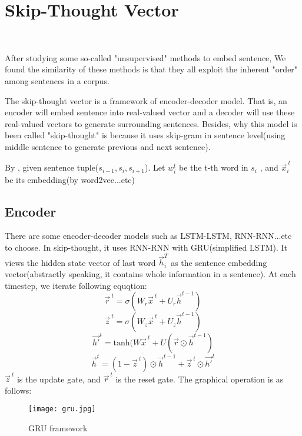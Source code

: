 \documentclass{article}
\begin{document}
\section{Skip-Thought Vector}
~~~~\par After studying some so-called "unsupervised" methods to embed sentence, We found the similarity of these methods is that they all exploit the inherent "order" among sentences in a corpus. 
	\newline

	\par The skip-thought vector is a framework of encoder-decoder model. That is, an encoder will embed sentence into real-valued vector and a decoder will use these real-valued vectors to generate surrounding sentences. Besides, why this model is been called "skip-thought" is because it uses skip-gram in sentence level(using middle sentence to generate previous and next sentence).
	\newline

	\par By \cite{kiros2015skip} , given sentence tuple($s_{i-1},s_i,s_{i+1}$). Let $w_{i}^{t}$ be the t-th word in $s_i$ , and $\vec{x}_{i}^{\ t}$ be its embedding(by word2vec...etc)

\subsection{Encoder}
	There are some encoder-decoder models such as LSTM-LSTM, RNN-RNN...etc to choose. In skip-thought\cite{kiros2015skip}, it uses RNN-RNN with GRU\cite{chung2015gated}(simplified LSTM). It views the hidden state vector of last word $\vec{h}_{i}^{T}$ as the sentence embedding vector(abstractly speaking, it contains whole information in a sentence). At each timestep, we iterate following equqtion:
	\[\vec{r}^{\ t} = \sigma(W_r\vec{x}^{\ t} + U_r\vec{h}^{t-1})\]
	\[\vec{z}^{\ t} = \sigma(W_z\vec{x}^{\ t} + U_z\vec{h}^{t-1})\]
	\[\vec{h'}^t = \text{tanh}(W\vec{x}^{\ t} + U(\vec{r}\odot \vec{h}^{t-1})\]
	\[\vec{h}^t = (1-\vec{z}^{\ t}) \odot \vec{h}^{t-1} + \vec{z}^{\ t} \odot \vec{h'}^t \]
	$\vec{z}^{\ t}$ is the update gate, and $\vec{r}^{\ t}$ is the reset gate. The graphical operation is as follows:
	\begin{figure}[H]
	\begin{center}
		\texttt{[image: gru.jpg]}
		\caption{GRU framework\cite{grufig}}
	\end{center}
\end{figure}
\end{document}
